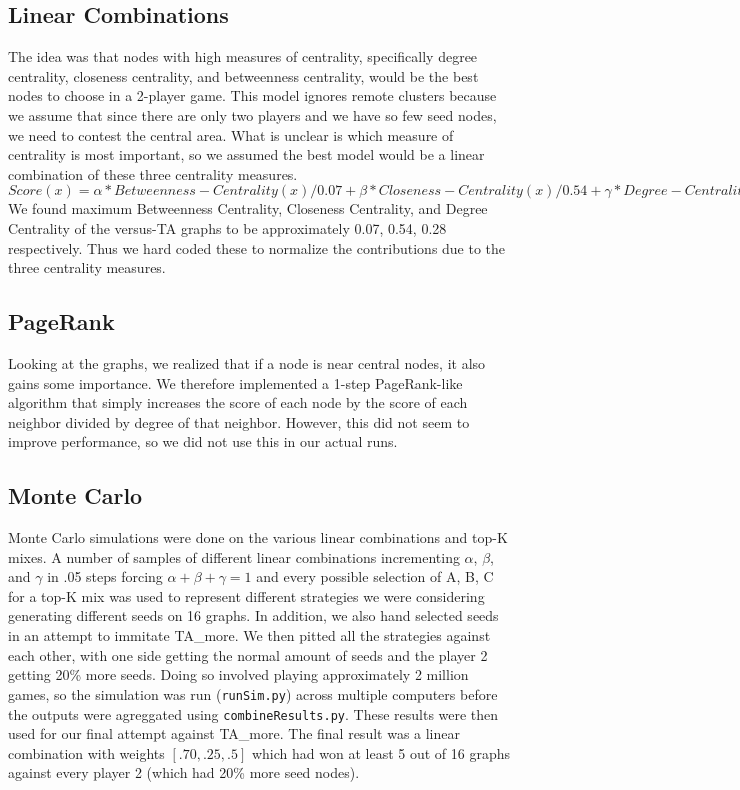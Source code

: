 \documentclass{article}
\begin{document}
\subsection*{Linear Combinations}
The idea was that nodes with high measures of centrality, specifically degree centrality, closeness centrality, and betweenness centrality, would be the best nodes to choose in a 2-player game. This model ignores remote clusters because we assume that since there are only two players and we have so few seed nodes, we need to contest the central area. What is unclear is which measure of centrality is most important, so we assumed the best model would be a linear combination of these three centrality measures. 
${Score}(x) = \alpha * {Betweenness-Centrality}(x) / 0.07 + \beta * {Closeness-Centrality}(x) / 0.54 + \gamma * {Degree-Centrality}(x) / 0.28$
We found maximum Betweenness Centrality, Closeness Centrality, and Degree Centrality of the versus-TA graphs to be approximately 0.07, 0.54, 0.28 respectively. Thus we hard coded these to normalize the contributions due to the three centrality measures.

\subsection*{PageRank}
Looking at the graphs, we realized that if a node is near central nodes, it also gains some importance. We therefore implemented a 1-step PageRank-like algorithm that simply increases the score of each node by the score of each neighbor divided by degree of that neighbor. However, this did not seem to improve performance, so we did not use this in our actual runs.

\subsection*{Monte Carlo}
Monte Carlo simulations were done on the various linear combinations and top-K mixes. A number of samples of different linear combinations incrementing $\alpha$, $\beta$, and $\gamma$ in .05 steps forcing $\alpha + \beta + \gamma = 1$ and every possible selection of A, B, C for a top-K mix was used to represent different strategies we were considering generating different seeds on 16 graphs. In addition, we also hand selected seeds in an attempt to immitate TA\_more. We then pitted all the strategies against each other, with one side getting the normal amount of seeds and the player 2 getting 20\% more seeds. Doing so involved playing approximately 2 million games, so the simulation was run (\texttt{runSim.py}) across multiple computers before the outputs were agreggated using \texttt{combineResults.py}. These results were then used for our final attempt against TA\_more. The final result was a linear combination with weights $[.70, .25, .5]$ which had won at least 5 out of 16 graphs against every player 2 (which had 20\% more seed nodes). 
\end{document}
